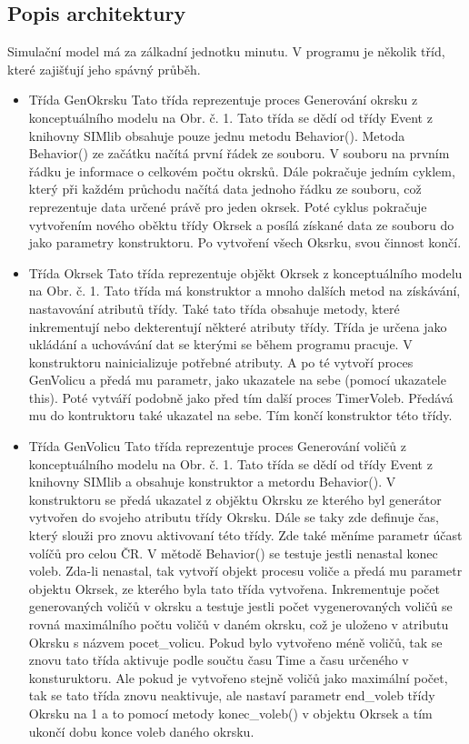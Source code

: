 \documentclass[12pt,a4paper,titlepage,final]{article}
\begin{document}
\subsection{Popis architektury}
Simulační model má za zálkadní jednotku minutu. \newline
V programu je několik tříd, které zajišťují jeho spávný průběh. 
 \begin{itemize}
\item Třída GenOkrsku
\subitem Tato třída reprezentuje proces Generování okrsku z konceptuálního modelu na Obr. č. 1. Tato třída se dědí od třídy Event z knihovny SIMlib obsahuje pouze jednu metodu Behavior(). Metoda Behavior() ze začátku načítá první řádek ze souboru. V souboru na prvním řádku je informace o celkovém počtu okrsků. Dále pokračuje jedním cyklem, který při každém průchodu načítá data jednoho řádku ze souboru, což reprezentuje data určené právě pro jeden okrsek. Poté cyklus pokračuje vytvořením nového oběktu třídy Okrsek a posílá získané data ze souboru do jako parametry konstruktoru. Po vytvoření všech Oksrku, svou činnost končí.

\item Třída Okrsek
\subitem Tato třída reprezentuje objěkt Okrsek z konceptuálního modelu na Obr. č. 1. Tato třída má konstruktor a mnoho dalších metod na získávání, nastavování atributů třídy. Také tato třída obsahuje metody, které inkrementují nebo dekterentují některé atributy třídy. Třída je určena jako ukládání a uchovávání dat se kterými se během programu pracuje. V konstruktoru nainicializuje potřebné atributy. A po té vytvoří proces GenVolicu a předá mu parametr, jako ukazatele na sebe (pomocí ukazatele this). Poté vytváří podobně jako před tím další proces TimerVoleb. Předává mu do kontruktoru také ukazatel na sebe. Tím končí konstruktor této třídy.

\item Třída GenVolicu
\subitem Tato třída reprezentuje proces Generování voličů z konceptuálního modelu na Obr. č. 1. Tato třída se dědí od třídy Event z knihovny SIMlib a obsahuje konstruktor a metordu Behavior(). V konstruktoru se předá ukazatel z objěktu Okrsku ze kterého byl generátor vytvořen do svojeho atributu třídy Okrsku. Dále se taky zde definuje čas, který slouži pro znovu aktivovaní této třídy. Zde také měníme parametr účast volíčů pro celou ČR. V mětodě Behavior() se testuje jestli nenastal konec voleb. Zda-li nenastal, tak vytvoří objekt procesu voliče a předá mu parametr objektu Okrsek, ze kterého byla tato třída vytvořena. Inkrementuje počet generovaných voličů v okrsku a testuje jestli počet vygenerovaných voličů se rovná maximálního počtu voličů v daném okrsku, což je uloženo v atributu Okrsku s názvem pocet\_volicu. Pokud bylo vytvořeno méně voličů, tak se znovu tato třída aktivuje podle součtu času Time a času určeného v konsturuktoru. Ale pokud je vytvořeno stejně voličů jako maximální počet, tak se tato třída znovu neaktivuje, ale nastaví parametr end\_voleb třídy Okrsku na 1 a to pomocí metody konec\_voleb() v objektu Okrsek a tím ukončí dobu konce voleb daného okrsku. 


\end{itemize}
\end{document}
